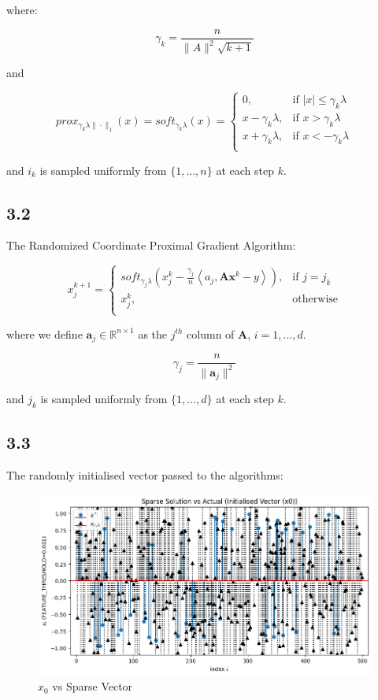 \documentclass[12pt]{article}
\begin{document}
where:

\[\gamma_k = \frac{n}{\|A\|^2 \sqrt{k+1}}\]

and

\[prox_{\gamma_k \lambda \|\cdot\|_1}(x) = soft_{\gamma_k \lambda}(x) = \begin{cases}
      0, &  \text{if } |x| \leq \gamma_k \lambda \\
      x-\gamma_k \lambda, & \text{if } x > \gamma_k \lambda \\
      x+\gamma_k \lambda, & \text{if } x < - \gamma_k \lambda \\
   \end{cases}\]

and $i_k$ is sampled uniformly from $\{1, ..., n\}$ at each step $k$.

\subsection*{3.2}

The Randomized Coordinate Proximal Gradient Algorithm:

\[x_j^{k+1} = \begin{cases}
      soft_{\gamma_j \lambda}(x_j^k - \frac{\gamma_j}{n} \left\langle a_j, \textbf{A} \textbf{x}^k - y\right\rangle), & \text{if } j = j_k \\
      x_j^k, & \text{otherwise} \\
   \end{cases}
\]

where we define $\textbf{a}_j \in \mathbb{R}^{n \times 1}$ as the $j^{th}$ column of $\textbf{A}$, $i=1, ..., d$.

\[\gamma_j = \frac{n}{\|\textbf{a}_j\|^2}\]

and $j_k$ is sampled uniformly from $\{1, ..., d\}$ at each step $k$.

\newpage
\subsection*{3.3}

The randomly initialised vector passed to the algorithms:

\begin{figure}[h]
\centering
\includegraphics[scale=0.35]{outputs/part_3/initial-x}
\caption{$x_0$ vs Sparse Vector}
\label{fig:}
\end{figure}
\end{document}
